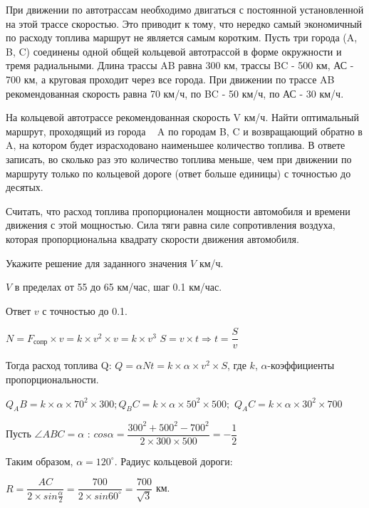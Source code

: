 
При движении по автотрассам необходимо двигаться с постоянной
установленной на этой трассе скоростью. Это приводит к тому, что нередко самый
экономичный по расходу топлива маршрут не является самым коротким.  Пусть три города (A, B, C) соединены одной общей кольцевой
автотрассой в форме окружности и тремя радиальными.  Длина трассы AB
равна 300 км, трассы BC - 500 км, АС - 700
км, а круговая проходит через все города. 
При движении по трассе AB рекомендованная
скорость равна 70 км/ч, по BC - 50 км/ч, по АС - 30 км/ч. 

На кольцевой автотрассе рекомендованная скорость V км/ч. Найти оптимальный маршрут, проходящий из города   A по городам B, C и возвращающий обратно в A, на котором будет израсходовано наименьшее количество топлива. В
ответе записать, во сколько раз это количество топлива меньше, чем при движении
по маршруту только по кольцевой дороге (ответ больше единицы) с точностью до десятых.

Считать, что
расход топлива пропорционален мощности автомобиля и времени движения с этой мощностью. Сила тяги равна силе сопротивления воздуха, которая пропорциональна квадрату скорости
движения автомобиля.

Укажите решение для заданного значения $V$ км/ч.

\paramSection

$V$ в пределах от 55 до 65 км/час, шаг 0.1 км/час. 

Ответ $v$ с точностью до 0.1.

\soultionSection

$N=F_{\text{сопр}} \times v=k \times v^2 \times v=k \times v^3$                         $S=v \times t \Rightarrow t=\dfrac{S}{v} $ 

Тогда расход топлива Q:   $Q=\alpha Nt=k \times \alpha  \times v^2 \times S$, где $k$, $\alpha $-коэффициенты 
пропорциональности. 

$Q_AB=k \times \alpha  \times 70^2 \times 300; Q_BC=k \times \alpha  \times 50^2 \times 500; $
$Q_AC=k \times \alpha  \times 30^2 \times 700$

Пусть $\angle ABC=\alpha$ : $cos\alpha = \dfrac{300^2+500^2-700^2}{2 \times 300 \times 500}=-\dfrac{1}{2}$

Таким образом, $\alpha =120^{\circ}$.  Радиус кольцевой дороги: 

$R=\dfrac{AC}{2 \times sin\frac{\alpha}{2}}= \dfrac{700}{2 \times sin60^{\circ}}=\dfrac{700}{\sqrt{3}}$  км.

